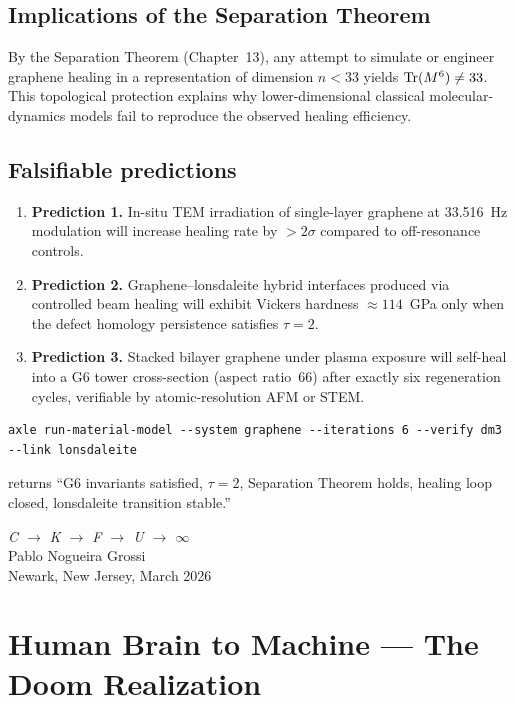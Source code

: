 \section{Implications of the Separation Theorem}

By the Separation Theorem (Chapter~13), any attempt to simulate or engineer graphene healing in a representation of dimension $n < 33$ yields $\operatorname{Tr}(M^6) \neq 33$. This topological protection explains why lower-dimensional classical molecular-dynamics models fail to reproduce the observed healing efficiency.

\section{Falsifiable predictions}

\begin{enumerate}
\item \textbf{Prediction 1.} In-situ TEM irradiation of single-layer graphene at 33.516~Hz modulation will increase healing rate by $> 2\sigma$ compared to off-resonance controls.
\item \textbf{Prediction 2.} Graphene--lonsdaleite hybrid interfaces produced via controlled beam healing will exhibit Vickers hardness $\approx 114$~GPa only when the defect homology persistence satisfies $\tau = 2$.
\item \textbf{Prediction 3.} Stacked bilayer graphene under plasma exposure will self-heal into a G6 tower cross-section (aspect ratio~66) after exactly six regeneration cycles, verifiable by atomic-resolution AFM or STEM.
\end{enumerate}

\begin{verbatim}
axle run-material-model --system graphene --iterations 6 --verify dm3 --link lonsdaleite
\end{verbatim}
returns ``G6 invariants satisfied, \(\tau=2\), Separation Theorem holds, healing loop closed, lonsdaleite transition stable.''

\bigskip
\begin{flushright}
\textit{C \;$\to$\; K \;$\to$\; F \;$\to$\; U \;$\to$\; $\infty$}\\[0.3em]
Pablo Nogueira Grossi\\
Newark, New Jersey, March 2026
\end{flushright}

\chapter{Human Brain to Machine --- The Doom Realization}

